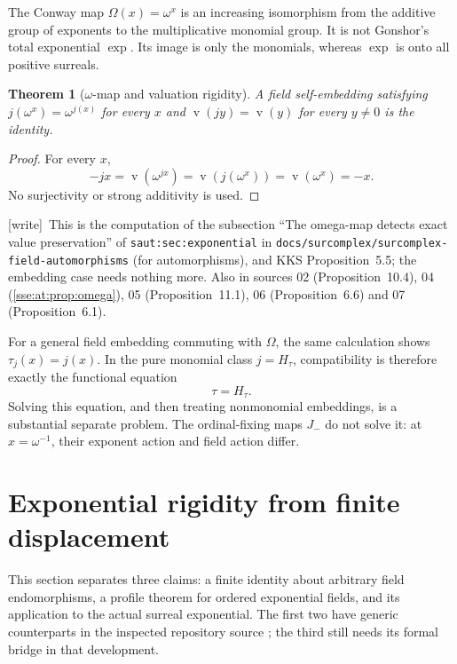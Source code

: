 \documentclass[11pt,a4paper]{article}
\numberwithin{equation}{section}
\theoremstyle{plain}
\newtheorem{theorem}{Theorem}[section]
\theoremstyle{definition}
\theoremstyle{remark}
\newcommand{\val}{\operatorname{v}}
\newcommand{\lbl}[1]{\nolinkurl{#1}}%
\newcommand{\fn}[1]{\nolinkurl{#1}}%
\newcommand{\wtag}{\textup{\textsf{[write]}}}%
\newenvironment{wnote}{\par\smallskip\noindent\wtag\ }{\par\smallskip}
\begin{document}
The Conway map $\Omega(x)=\omega^x$ is an increasing isomorphism from the
additive group of exponents to the multiplicative monomial group. It is
not Gonshor's total exponential $\exp$. Its image is only the monomials,
whereas $\exp$ is onto all positive surreals.

\begin{theorem}[$\omega$-map and valuation rigidity]\label{sse:thm:omegarigidity}
A field self-embedding satisfying
$j(\omega^x)=\omega^{j(x)}$ for every $x$ and
$\val(jy)=\val(y)$ for every $y\ne0$ is the identity.
\end{theorem}
\begin{proof}
For every $x$,
\[
 -jx=\val(\omega^{jx})=\val(j(\omega^x))=\val(\omega^x)=-x.
\]
No surjectivity or strong additivity is used.
\end{proof}
\begin{wnote}This is the computation of the subsection ``The omega-map detects exact value preservation'' of \lbl{saut:sec:exponential} in \fn{docs/surcomplex/surcomplex-field-automorphisms} (for automorphisms), and KKS Proposition~5.5; the embedding case needs nothing more. Also in sources 02 (Proposition~10.4), 04 (\cref{sse:at:prop:omega}), 05 (Proposition~11.1), 06 (Proposition~6.6) and 07 (Proposition~6.1).\end{wnote}
For a general field embedding commuting with $\Omega$, the same calculation
shows $\tau_j(x)=j(x)$. In the pure monomial class $j=H_\tau$, compatibility
is therefore exactly the functional equation
\begin{equation}\label{sse:eq:omegafunctional}
 \tau=H_\tau.
\end{equation}
Solving this equation, and then treating nonmonomial embeddings, is a
substantial separate problem. The ordinal-fixing maps $J_-$ do not solve
it: at $x=\omega^{-1}$, their exponent action and field action differ.

\section{Exponential rigidity from finite displacement}\label{sse:sec:exponential}

This section separates three claims: a finite identity about arbitrary
field endomorphisms, a profile theorem for ordered exponential fields,
and its application to the actual surreal exponential. The first two
have generic counterparts in the inspected repository source
\cite{RepoExp,RepoProfile}; the third still needs its formal bridge in
that development.
\end{document}
